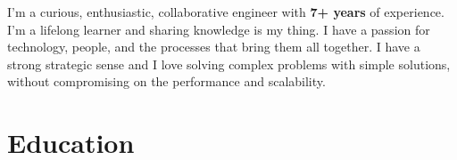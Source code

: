 \documentclass[]{friggeri-cv} %
\begin{document}
I'm a curious, enthusiastic, collaborative engineer with \textbf{7+ years} of experience. I'm a lifelong learner and sharing knowledge is my thing. I have a passion for technology, people, and the processes that bring them all together. I have a strong strategic sense and I love solving complex problems with simple solutions, without compromising on the performance and scalability.


\section{Education}

\end{document}
